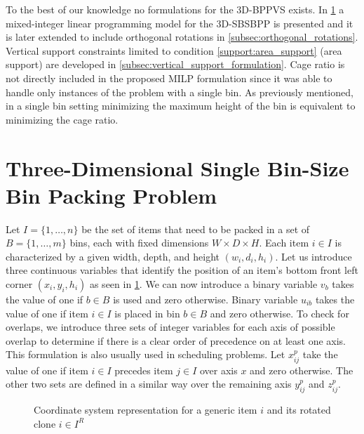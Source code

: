 To the best of our knowledge no formulations for the 3D-BPPVS exists.
In \cref{sec:milp} a mixed-integer linear programming model for the 3D-SBSBPP is presented and it is later extended to include orthogonal rotations in \cref{subsec:orthogonal_rotations}.
Vertical support constraints limited to condition \ref{support:area_support} (area support) are developed in \cref{subsec:vertical_support_formulation}.
Cage ratio is not directly included in the proposed MILP formulation since it was able to handle only instances of the problem with a single bin.
As previously mentioned, in a single bin setting minimizing the maximum height of the bin is equivalent to minimizing the cage ratio.

\newpage
\section{Three-Dimensional Single Bin-Size Bin Packing Problem}
\label{sec:milp}%
Let $I = \{1,\dots, n \}$ be the set of items that need to be packed in a set of $B = \{1,\dots, m \}$ bins, each with fixed dimensions $W \times D \times H$.
Each item $i \in I$ is characterized by a given width, depth, and height $(w_i, d_i, h_i)$.
Let us introduce three continuous variables that identify the position of an item's bottom front left corner $(x_i, y_i, h_i)$ as seen in \cref{fig:coordinate_system}.
We can now introduce a binary variable $v_{b}$ takes the value of one if $b \in B$ is used and zero otherwise. Binary variable $u_{ib}$ takes the value of one if item $i \in I$ is placed in bin $b \in B$ and zero otherwise.
To check for overlaps, we introduce three sets of integer variables for each axis of possible overlap to determine if there is a clear order of precedence on at least one axis. This formulation is also usually used in scheduling problems.
Let $x^p_{ij}$ take the value of one if item $i \in I$ precedes item $j \in I$ over axis $x$ and zero otherwise.
The other two sets are defined in a similar way over the remaining axis $y^p_{ij}$ and $z^p_{ij}$.

\begin{figure}
    \scalebox{0.62}{%
    
    }
    \caption{Coordinate system representation for a generic item $i$ and its rotated clone $i \in I^R$}
    \label{fig:coordinate_system}
\end{figure}

